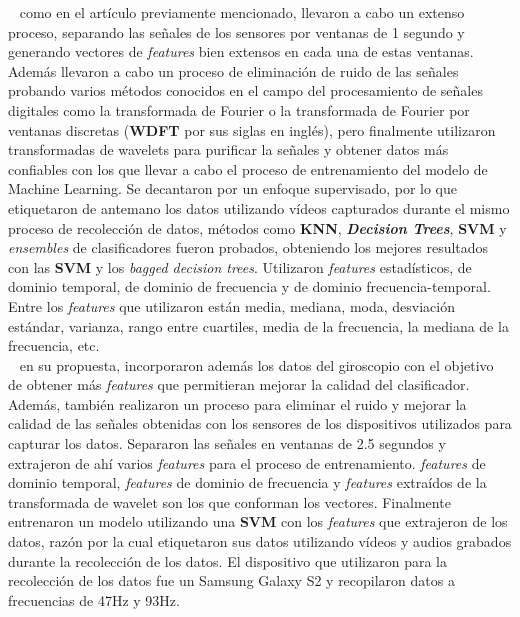 ~\cite{el2018towards} como en el artículo previamente mencionado, llevaron a cabo un extenso proceso, separando las señales de los sensores por
ventanas de 1 segundo y generando vectores de \emph{features} bien extensos en cada una de estas ventanas. Además llevaron a cabo un proceso de eliminación de ruido
de las señales probando varios métodos conocidos en el campo del procesamiento de señales digitales como la transformada de Fourier o la transformada de
Fourier por ventanas discretas (\textbf{WDFT} por sus siglas en inglés), pero finalmente utilizaron transformadas de wavelets para purificar la señales y obtener
datos más confiables con los que llevar a cabo el proceso de entrenamiento del modelo de Machine Learning. Se decantaron por un enfoque supervisado, por lo que
etiquetaron de antemano los datos utilizando vídeos capturados durante el mismo proceso de recolección de datos, métodos como \textbf{KNN},
\emph{\textbf{Decision Trees}}, \textbf{SVM} y \emph{ensembles} de clasificadores fueron probados, obteniendo los mejores resultados con las \textbf{SVM} y los
\emph{bagged decision trees}. Utilizaron \emph{features} estadísticos, de dominio temporal, de dominio de frecuencia y de dominio frecuencia-temporal. Entre los
\emph{features} que utilizaron están media, mediana, moda, desviación estándar, varianza, rango entre cuartiles, media de la frecuencia, la mediana de la frecuencia,
etc.\\

~\cite{seraj2015roads} en su propuesta, incorporaron además los datos del giroscopio con el objetivo de obtener más \emph{features} que permitieran mejorar la calidad
del clasificador. Además, también realizaron un proceso para eliminar el ruido y mejorar la calidad de las señales obtenidas con los sensores de los dispositivos
utilizados para capturar los datos. Separaron las señales en ventanas de 2.5 segundos y extrajeron de ahí varios \emph{features} para el proceso de entrenamiento.
\emph{features} de dominio temporal, \emph{features} de dominio de frecuencia y \emph{features} extraídos de la transformada de wavelet son los que conforman los vectores.
Finalmente entrenaron un modelo utilizando una \textbf{SVM} con los \emph{features} que extrajeron de los datos, razón por la cual etiquetaron sus datos utilizando vídeos
y audios grabados durante la recolección de los datos. El dispositivo que utilizaron para la recolección de los datos fue un Samsung Galaxy S2 y recopilaron datos a
frecuencias de 47Hz y 93Hz.\\

